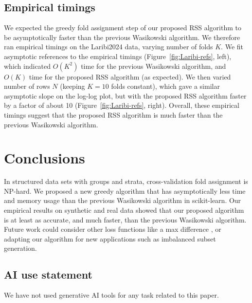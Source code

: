 \documentclass[twoside]{article}
\begin{document}
\subsection{Empirical timings}

We expected the greedy fold assignment step of our proposed RSS algorithm to be asymptotically faster than the previous Wasikowski algorithm.
We therefore ran empirical timings on the Laribi2024 data, varying number of folds $K$.
We fit asymptotic references to the empirical timings (Figure~\ref{fig:Laribi-refs}, left), which indicated $O(K^2)$ time for the previous Wasikowski algorithm, and $O(K)$ time for the proposed RSS algorithm (as expected).
We then varied number of rows $N$ (keeping $K=10$ folds constant), which gave a similar asymptotic slope on the log-log plot, but with the proposed RSS algorithm faster by a factor of about 10 (Figure~\ref{fig:Laribi-refs}, right).
Overall, these empirical timings suggest that the proposed RSS algorithm is much faster than the previous Wasikowski algorithm.

\section{Conclusions}

In structured data sets with groups and strata, cross-validation fold assignment is NP-hard.
We proposed a new greedy algorithm that has asymptotically less time and memory usage than the previous Wasikowski algorithm in scikit-learn.
Our empirical results on synthetic and real data showed that our proposed algorithm is at least as accurate, and much faster, than the previous Wasikowski algorithm.
Future work could consider 
other loss functions like a max difference \citep{Pop2013},
or adapting our algorithm for new applications such as imbalanced subset generation.

\subsection*{AI use statement}

We have not used generative AI tools for any task related to this paper.

\end{document}
